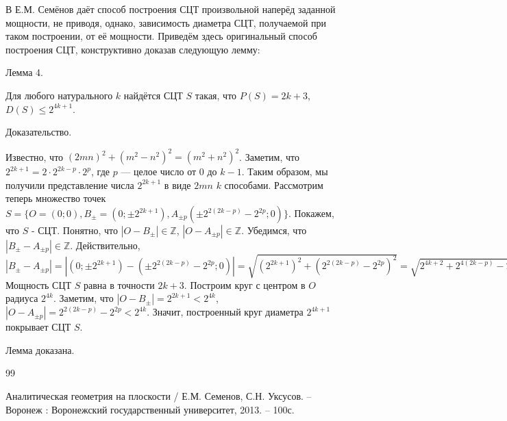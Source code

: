 \documentclass[a4paper,14pt]{article}
\newcommand{\Z}{\mathbb{Z}}
\begin{document}
В \cite{angem1kurs} Е.М. Семёнов даёт способ построения СЦТ произвольной наперёд заданной мощности, не приводя, однако, зависимость диаметра СЦТ, получаемой при таком построении, от её мощности.
Приведём здесь оригинальный способ построения СЦТ, конструктивно доказав следующую лемму:

Лемма 4.

Для любого натурального $k$ найдётся СЦТ $S$ такая, что $P(S)=2k+3$, $D(S)\leq 2^{4k+1}$.

Доказательство.

Известно, что $(2mn)^2+(m^2-n^2)^2=(m^2+n^2)^2$.
Заметим, что $2^{2k+1} = 2 \cdot 2^{2k-p} \cdot 2^p$, где $p$ --- целое число от $0$ до $k-1$.
Таким образом, мы получили представление числа $2^{2k+1}$ в виде $2mn$ $k$ способами.
Рассмотрим теперь множество точек $S=\{O=(0;0),B_\pm=(0;\pm 2^{2k+1}),A_{\pm p}(\pm 2^{2(2k-p)}-2^{2p};0)\}$.
Покажем, что $S$ - СЦТ.
Понятно, что $|O-B_\pm|\in\Z$, $|O-A_{\pm p}|\in\Z$.
Убедимся, что $|B_\pm-A_{\pm p}|\in\Z$.
Действительно, $|B_\pm-A_{\pm p}|=|(0;\pm 2^{2k+1}) - (\pm 2^{2(2k-p)}-2^{2p};0)| = \sqrt{(2^{2k+1})^2+(2^{2(2k-p)}-2^{2p})^2}=
\sqrt{2^{4k+2}+2^{4(2k-p)}-2\cdot 2^{4k}+2^4p}=\sqrt{2^{4(2k-p)}+2\cdot 2^{4k}+2^4p}=2^{2(2k-p)}+2^{2p}\in\Z$
Мощность СЦТ $S$ равна в точности $2k+3$.
Построим круг с центром в $O$ радиуса $2^{4k}$.
Заметим, что $|O-B_\pm|=2^{2k+1}<2^{4k}$, $|O-A_{\pm p}| = 2^{2(2k-p)}-2^{2p} < 2^{4k}$.
Значит, построенный круг диаметра $2^{4k+1}$ покрывает СЦТ $S$.

Лемма доказана.


\begin{thebibliography}{99}

 Аналитическая геометрия на плоскости / Е.М. Семенов, С.Н. Уксусов. – Воронеж : Воронежский государственный университет, 2013. – 100с.

\end{thebibliography}
\end{document}
